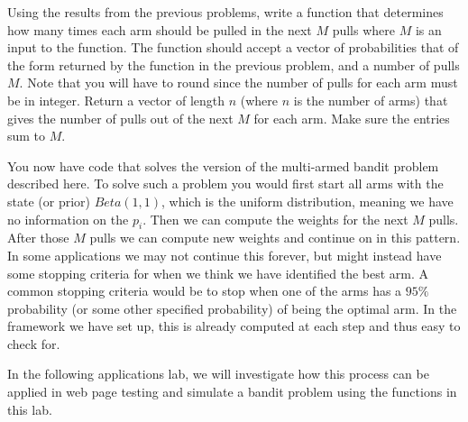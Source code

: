 \begin{problem}
Using the results from the previous problems, write a function that determines how many times each arm should be pulled in the next $M$ pulls where $M$ is an input to the function.  The function should accept a vector of probabilities that of the form returned by the function in the previous problem, and a number of pulls $M$.  Note that you will have to round since the number of pulls for each arm must be in integer.  Return a vector of length $n$ (where $n$ is the number of arms) that gives the number of pulls out of the next $M$ for each arm.  Make sure the entries sum to $M$.
\end{problem}

You now have code that solves the version of the multi-armed bandit problem described here.  To solve such a problem you would first start all arms with the state (or prior) $Beta(1,1)$, which is the uniform distribution, meaning we have no information on the $p_i$.  Then we can compute the weights for the next $M$ pulls.  After those $M$ pulls we can compute new weights and continue on in this pattern.  In some applications we may not continue this forever, but might instead have some stopping criteria for when we think we have identified the best arm.  A common stopping criteria would be to stop when one of the arms has a $95\%$ probability (or some other specified probability) of being the optimal arm.  In the framework we have set up, this is already computed at each step and thus easy to check for.

In the following applications lab, we will investigate how this process can be applied in web page testing and simulate a bandit problem using the functions in this lab. 